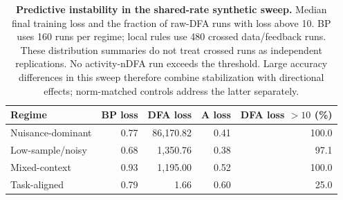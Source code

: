 \begin{table}[!htbp]
\centering\small
\setlength{\tabcolsep}{4pt}
\begin{tabular}{@{}lrrrr@{}}
\toprule
Regime & BP loss & DFA loss & A loss & DFA loss $>10$ (\%) \\
\midrule
Nuisance-dominant & 0.77 & 86,170.82 & 0.41 & 100.0 \\
Low-sample/noisy & 0.68 & 1,350.76 & 0.38 & 97.1 \\
Mixed-context & 0.93 & 1,195.00 & 0.52 & 100.0 \\
Task-aligned & 0.79 & 1.66 & 0.60 & 25.0 \\
\bottomrule
\end{tabular}
\caption{\textbf{Predictive instability in the shared-rate synthetic sweep.} Median final training loss and the fraction of raw-DFA runs with loss above 10. BP uses 160 runs per regime; local rules use 480 crossed data/feedback runs. These distribution summaries do not treat crossed runs as independent replications. No activity-nDFA run exceeds the threshold. Large accuracy differences in this sweep therefore combine stabilization with directional effects; norm-matched controls address the latter separately.}
\label{tab:infodfa_synthetic_stability}
\end{table}
